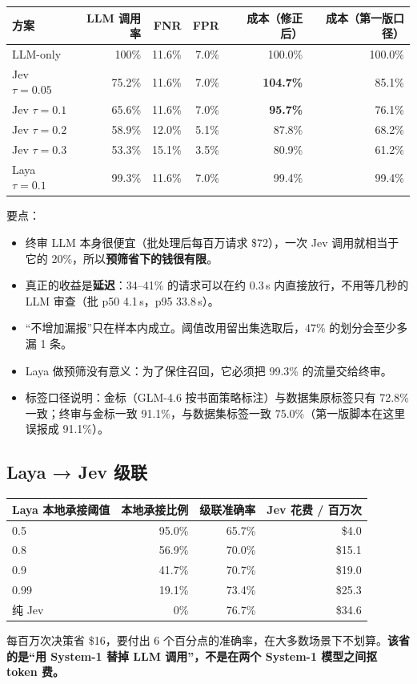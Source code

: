 \documentclass[UTF8,fontset=none,zihao=-4]{ctexart}
\newcommand{\laya}{\textsf{Laya}}
\newcommand{\jev}{\textsf{Jev}}
\begin{document}
\begin{center}\small
\begin{tabular}{@{}lrrrrr@{}}
\toprule
方案 & LLM 调用率 & FNR & FPR & 成本（修正后） & 成本（第一版口径）\\
\midrule
LLM-only & 100\% & 11.6\% & 7.0\% & 100.0\% & 100.0\%\\
\jev{} $\tau{=}0.05$ & 75.2\% & 11.6\% & 7.0\% & \textbf{104.7\%} & 85.1\%\\
\jev{} $\tau{=}0.1$ & 65.6\% & 11.6\% & 7.0\% & \textbf{95.7\%} & 76.1\%\\
\jev{} $\tau{=}0.2$ & 58.9\% & 12.0\% & 5.1\% & 87.8\% & 68.2\%\\
\jev{} $\tau{=}0.3$ & 53.3\% & 15.1\% & 3.5\% & 80.9\% & 61.2\%\\
\laya{} $\tau{=}0.1$ & 99.3\% & 11.6\% & 7.0\% & 99.4\% & 99.4\%\\
\bottomrule
\end{tabular}
\end{center}
要点：
\begin{itemize}
\item 终审 LLM 本身很便宜（批处理后每百万请求 \$72），一次 \jev{} 调用就相当于它的 20\%，所以\textbf{预筛省下的钱很有限}。
\item 真正的收益是\textbf{延迟}：34--41\% 的请求可以在约 0.3\,s 内直接放行，不用等几秒的 LLM 审查（批 p50 4.1\,s，p95 33.8\,s）。
\item “不增加漏报”只在样本内成立。阈值改用留出集选取后，47\% 的划分会至少多漏 1 条。
\item \laya{} 做预筛没有意义：为了保住召回，它必须把 99.3\% 的流量交给终审。
\item 标签口径说明：金标（GLM-4.6 按书面策略标注）与数据集原标签只有 72.8\% 一致；终审与金标一致 91.1\%，与数据集标签一致 75.0\%（第一版脚本在这里误报成 91.1\%）。
\end{itemize}

\subsection{\laya{} → \jev{} 级联}
\begin{center}\small
\begin{tabular}{@{}lrrr@{}}
\toprule
\laya{} 本地承接阈值 & 本地承接比例 & 级联准确率 & \jev{} 花费 / 百万次\\
\midrule
0.5 & 95.0\% & 65.7\% & \$4.0\\
0.8 & 56.9\% & 70.0\% & \$15.1\\
0.9 & 41.7\% & 70.7\% & \$19.0\\
0.99 & 19.1\% & 73.4\% & \$25.3\\
纯 \jev{} & 0\% & 76.7\% & \$34.6\\
\bottomrule
\end{tabular}
\end{center}
每百万次决策省 \$16，要付出 6 个百分点的准确率，在大多数场景下不划算。\textbf{该省的是“用 System-1 替掉 LLM 调用”，不是在两个 System-1 模型之间抠 token 费。}
\end{document}
